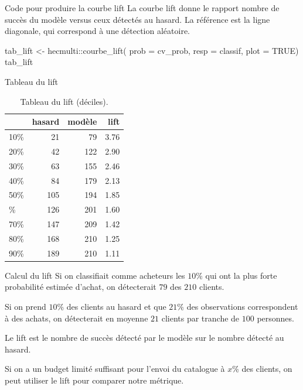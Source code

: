 \documentclass[
  ignorenonframetext,
]{beamer}
\newenvironment{Shaded}{\begin{snugshade}}{\end{snugshade}}
\newcommand{\AttributeTok}[1]{\textcolor[rgb]{0.40,0.45,0.13}{#1}}
\newcommand{\ConstantTok}[1]{\textcolor[rgb]{0.56,0.35,0.01}{#1}}
\newcommand{\FunctionTok}[1]{\textcolor[rgb]{0.28,0.35,0.67}{#1}}
\newcommand{\NormalTok}[1]{\textcolor[rgb]{0.00,0.23,0.31}{#1}}
\newcommand{\OtherTok}[1]{\textcolor[rgb]{0.00,0.23,0.31}{#1}}
\newcommand{\SpecialCharTok}[1]{\textcolor[rgb]{0.37,0.37,0.37}{#1}}
\begin{document}
\begin{frame}[fragile]{Code pour produire la courbe lift}
\protect\hypertarget{code-pour-produire-la-courbe-lift}{}
La courbe lift donne le rapport nombre de succès du modèle versus ceux
détectés au hasard. La référence est la ligne diagonale, qui correspond
à une détection aléatoire.

\begin{Shaded}
\begin{Highlighting}[numbers=left,,]
\NormalTok{tab\_lift }\OtherTok{\textless{}{-}}\NormalTok{ hecmulti}\SpecialCharTok{::}\FunctionTok{courbe\_lift}\NormalTok{(}
  \AttributeTok{prob =}\NormalTok{ cv\_prob,}
  \AttributeTok{resp =}\NormalTok{ classif, }
  \AttributeTok{plot =} \ConstantTok{TRUE}\NormalTok{)}
\NormalTok{tab\_lift}
\end{Highlighting}
\end{Shaded}
\end{frame}

\begin{frame}{Tableau du lift}
\protect\hypertarget{tableau-du-lift}{}
\hypertarget{tbl-lift}{}
\begin{table}
\caption{\label{tbl-lift}Tableau du lift (déciles). }\tabularnewline

\centering
\begin{tabular}{lrrr}
\toprule
  & hasard & modèle & lift\\
\midrule
10\% & 21 & 79 & 3.76\\
20\% & 42 & 122 & 2.90\\
30\% & 63 & 155 & 2.46\\
40\% & 84 & 179 & 2.13\\
50\% & 105 & 194 & 1.85\\
\addlinespace
60\% & 126 & 201 & 1.60\\
70\% & 147 & 209 & 1.42\\
80\% & 168 & 210 & 1.25\\
90\% & 189 & 210 & 1.11\\
\bottomrule
\end{tabular}
\end{table}
\end{frame}

\begin{frame}{Calcul du lift}
\protect\hypertarget{calcul-du-lift}{}
Si on classifiait comme acheteurs les \(10\)\% qui ont la plus forte
probabilité estimée d'achat, on détecterait \(79\) des \(210\) clients.

Si on prend \(10\)\% des clients au hasard et que \(21\)\% des
observations correspondent à des achats, on détecterait en moyenne
\(21\) clients par tranche de \(100\) personnes.

Le lift est le nombre de succès détecté par le modèle sur le nombre
détecté au hasard.

Si on a un budget limité suffisant pour l'envoi du catalogue à \(x\)\%
des clients, on peut utiliser le lift pour comparer notre métrique.
\end{frame}
\end{document}
